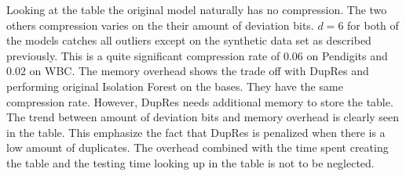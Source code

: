 Looking at the table the original model naturally has no compression. The two others compression varies on the their amount of deviation bits. $d=6$ for both of the models catches all outliers except on the synthetic data set as described previously. This is a quite significant compression rate of 0.06 on Pendigits and 0.02 on WBC.  The memory overhead shows the trade off with DupRes and performing original Isolation Forest on the bases. They have the same compression rate. However, DupRes needs additional memory to store the table. The trend between amount of deviation bits and memory overhead is clearly seen in the table. This emphasize the fact that DupRes is penalized when there is a low amount of duplicates. The overhead combined with the time spent creating the table and the testing time looking up in the table is not to be neglected.  

